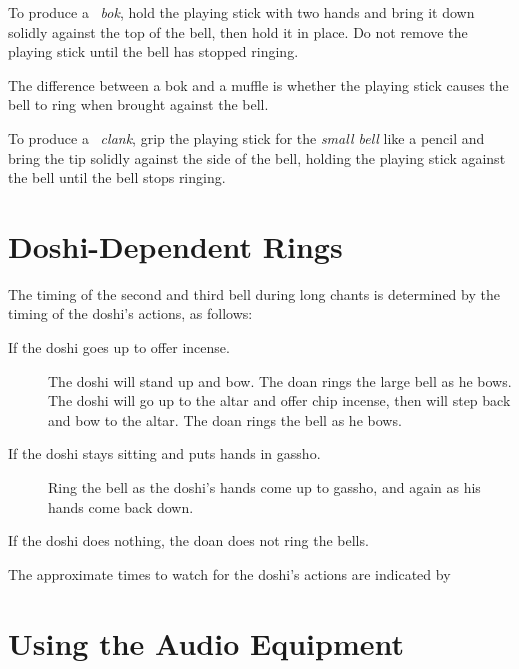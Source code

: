 \documentclass{chantbook}
\begin{document}
To produce a \bok\ \emph{bok}, hold the playing stick with two hands and bring it
down solidly against the top of the bell, then hold it in place. Do not remove
the playing stick until the bell has stopped ringing.

The difference between a bok and a muffle is whether the playing stick causes
the bell to ring when brought against the bell.

To produce a \clank\ \emph{clank}, grip the playing stick for the \emph{small bell}
like a pencil and bring the tip solidly against the side of the bell, holding
the playing stick against the bell until the bell stops ringing.

\section*{Doshi-Dependent Rings}
The timing of the second and third bell during long chants is determined by the
timing of the doshi's actions, as follows:

\begin{description}
\item[If the doshi goes up to offer incense.] The doshi will stand up and bow.
The doan rings the large bell as he bows. The doshi will go up to the altar and
offer chip incense, then will step back and bow to the altar. The doan rings
the bell as he bows.
\item[If the doshi stays sitting and puts hands in gassho.] Ring the bell as
the doshi's hands come up to gassho, and again as his hands come back down.
\end{description}

If the doshi does nothing, the doan does not ring the bells.

The approximate times to watch for the doshi's actions are indicated by

\section*{Using the Audio Equipment}
\end{document}

